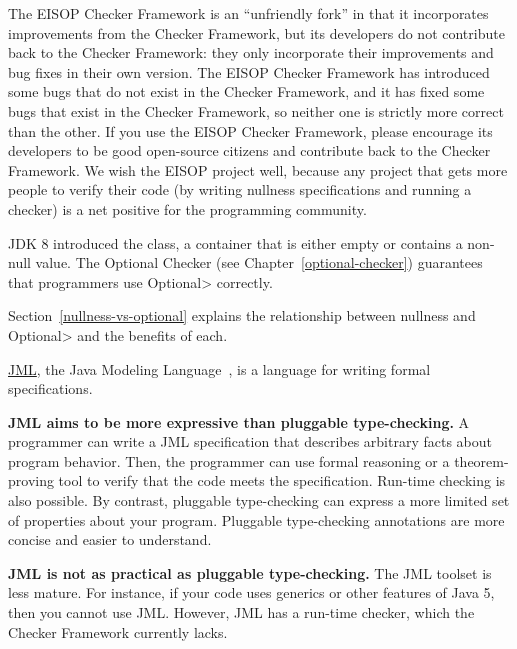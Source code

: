The EISOP Checker Framework is an ``unfriendly fork'' in that it
incorporates improvements from the Checker Framework, but its developers do
not contribute back to the Checker Framework:  they only incorporate their
improvements and bug fixes in their own version.  The EISOP Checker
Framework has introduced some bugs that do not exist in the Checker
Framework, and it has fixed some bugs that exist in the Checker Framework,
so neither one is strictly more correct than the other.  If you use the
EISOP Checker Framework, please encourage its developers to be good
open-source citizens and contribute back to the Checker Framework.  We wish
the EISOP project well, because any project that gets more people to verify
their code (by writing nullness specifications and running a checker) is a
net positive for the programming community.



JDK 8 introduced the 
class, a container that is either empty or contains a non-null value.
The Optional Checker (see Chapter~\ref{optional-checker}) guarantees that
programmers use \<Optional> correctly.

Section~\ref{nullness-vs-optional} explains the relationship between
nullness and \<Optional> and the benefits of each.



\href{https://www.eecs.ucf.edu/~leavens/JML/index.shtml}{JML}, the Java Modeling
Language~\cite{LeavensBR2006:JML}, is a language for writing formal
specifications.

\textbf{JML aims to be more expressive than pluggable type-checking.}
A programmer can write a JML specification that
describes arbitrary facts about program behavior.  Then, the programmer can
use formal reasoning or a theorem-proving tool to verify that the code
meets the specification.  Run-time checking is also possible.
By contrast, pluggable type-checking can express a more limited set of
properties about your program.  Pluggable type-checking annotations are
more concise and easier to understand.

\textbf{JML is not as practical as pluggable type-checking.}
The JML toolset is less mature.  For instance, if your code uses
generics or other features of Java 5, then you cannot use JML.
However, JML has a run-time checker, which the Checker Framework currently
lacks.


